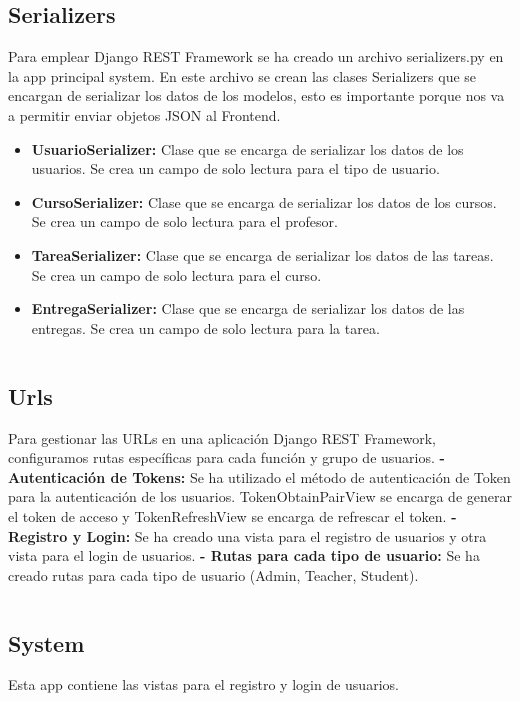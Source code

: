 \documentclass{article}
\begin{document}
\subsection{Serializers}
Para emplear Django REST Framework se ha creado un archivo serializers.py en la app principal system. En este archivo se crean las clases Serializers que se encargan de serializar los datos de los modelos, esto es importante porque nos va a permitir enviar objetos JSON al Frontend.
\begin{itemize}
	\item \textbf{UsuarioSerializer:} Clase que se encarga de serializar los datos de los usuarios. Se crea un campo de solo lectura para el tipo de usuario.
	\item \textbf{CursoSerializer:} Clase que se encarga de serializar los datos de los cursos. Se crea un campo de solo lectura para el profesor.
	\item \textbf{TareaSerializer:} Clase que se encarga de serializar los datos de las tareas. Se crea un campo de solo lectura para el curso.
	\item \textbf{EntregaSerializer:} Clase que se encarga de serializar los datos de las entregas. Se crea un campo de solo lectura para la tarea.
\end{itemize}
\inputminted{python3}{../backend/system/serializers.py}
\subsection{Urls}
Para gestionar las URLs en una aplicación Django REST Framework, configuramos rutas específicas para cada función y grupo de usuarios.\newline
\textbf{- Autenticación de Tokens:} Se ha utilizado el método de autenticación de Token para la autenticación de los usuarios. TokenObtainPairView se encarga de generar el token de acceso y TokenRefreshView se encarga de refrescar el token.\newline
\textbf{- Registro y Login:} Se ha creado una vista para el registro de usuarios y otra vista para el login de usuarios.\newline
\textbf{- Rutas para cada tipo de usuario:} Se ha creado rutas para cada tipo de usuario (Admin, Teacher, Student).
\inputminted{python3}{../backend/system/urls.py}
\subsection{System}
Esta app contiene las vistas para el registro y login de usuarios.
\end{document}
